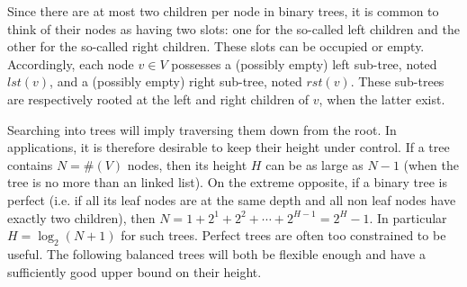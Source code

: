 \documentclass[12pt]{article}
\theoremstyle{plain}
\theoremstyle{remark}
\begin{document}
Since there are at most two children per node in binary trees, it is common 
to think of their nodes as having two slots: one for the so-called left children and
the other for the so-called right children. These slots can be occupied or empty.
Accordingly, each node $v \in V$ possesses a (possibly empty) left sub-tree, 
noted $lst(v)$, and a (possibly empty) right sub-tree, noted $rst(v)$. These
sub-trees are respectively rooted at the left and right children of $v$, when 
the latter exist.

\medskip

Searching into trees will imply traversing them down from the root. In
applications, it is therefore desirable to keep their height under control. If a
tree contains $N = \#(V)$ nodes, then its height $H$ can be as large as $N - 1$
(when the tree is no more than an linked list). On the extreme opposite, if a
binary tree is perfect (i.e. if all its leaf nodes are at the same depth and all non 
leaf nodes have exactly two children), then $N = 1 + 2^1 + 2^2 + \cdots + 2^{H -
1} = 2^H - 1.$ In particular $H = \log_2(N + 1)$ for such trees. Perfect trees are often too
constrained to be useful. The following balanced trees will both be flexible
enough and have a sufficiently good upper bound on their height.
\end{document}
